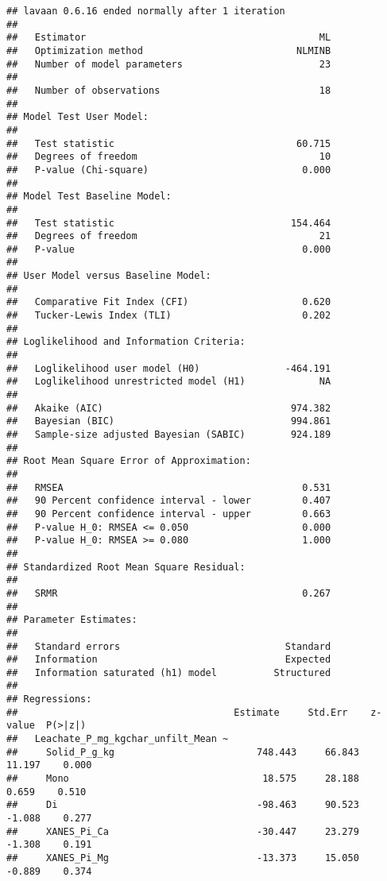 \documentclass[
]{article}
\begin{document}
\begin{verbatim}
## lavaan 0.6.16 ended normally after 1 iteration
## 
##   Estimator                                         ML
##   Optimization method                           NLMINB
##   Number of model parameters                        23
## 
##   Number of observations                            18
## 
## Model Test User Model:
##                                                       
##   Test statistic                                60.715
##   Degrees of freedom                                10
##   P-value (Chi-square)                           0.000
## 
## Model Test Baseline Model:
## 
##   Test statistic                               154.464
##   Degrees of freedom                                21
##   P-value                                        0.000
## 
## User Model versus Baseline Model:
## 
##   Comparative Fit Index (CFI)                    0.620
##   Tucker-Lewis Index (TLI)                       0.202
## 
## Loglikelihood and Information Criteria:
## 
##   Loglikelihood user model (H0)               -464.191
##   Loglikelihood unrestricted model (H1)             NA
##                                                       
##   Akaike (AIC)                                 974.382
##   Bayesian (BIC)                               994.861
##   Sample-size adjusted Bayesian (SABIC)        924.189
## 
## Root Mean Square Error of Approximation:
## 
##   RMSEA                                          0.531
##   90 Percent confidence interval - lower         0.407
##   90 Percent confidence interval - upper         0.663
##   P-value H_0: RMSEA <= 0.050                    0.000
##   P-value H_0: RMSEA >= 0.080                    1.000
## 
## Standardized Root Mean Square Residual:
## 
##   SRMR                                           0.267
## 
## Parameter Estimates:
## 
##   Standard errors                             Standard
##   Information                                 Expected
##   Information saturated (h1) model          Structured
## 
## Regressions:
##                                      Estimate     Std.Err    z-value  P(>|z|)
##   Leachate_P_mg_kgchar_unfilt_Mean ~                                         
##     Solid_P_g_kg                         748.443     66.843   11.197    0.000
##     Mono                                  18.575     28.188    0.659    0.510
##     Di                                   -98.463     90.523   -1.088    0.277
##     XANES_Pi_Ca                          -30.447     23.279   -1.308    0.191
##     XANES_Pi_Mg                          -13.373     15.050   -0.889    0.374

\end{verbatim}
\end{document}
